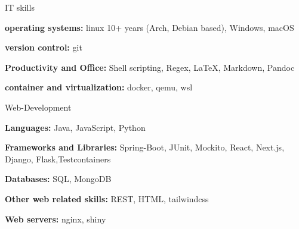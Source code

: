 

\begin{cvskills}
  \cvskill
    {IT skills} %
    {
      \begin{cvitems}
        \item {\textbf{operating systems:} linux 10+ years (Arch, Debian based), Windows, macOS}
        \item {\textbf{version control:} git}
        \item {\textbf{Productivity and Office:} Shell scripting, Regex, LaTeX, Markdown, Pandoc}
        \item {\textbf{container and virtualization:} docker, qemu, wsl}
      \end{cvitems}
      }
\cvskill
{Web-Development}%
{
  \begin{cvitems}
    \item {\textbf{Languages:} Java, JavaScript, Python}
    \item {\textbf{Frameworks and Libraries:} Spring-Boot, JUnit, Mockito, React, Next.js, Django, Flask,\newline Testcontainers}
    \item {\textbf{Databases:} SQL, MongoDB}
    \item {\textbf{Other web related skills:} REST, HTML, tailwindcss}
    \item {\textbf{Web servers:} nginx, shiny}
  \end{cvitems}
}


\end{cvskills}
